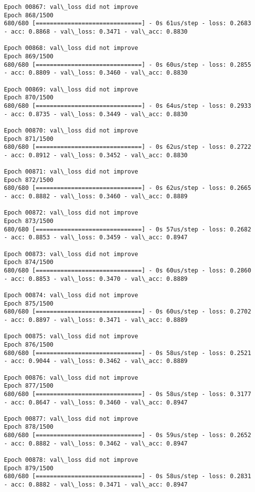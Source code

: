 \documentclass[11pt]{article}
\begin{document}
\begin{Verbatim}[commandchars=\\\{\}]
Epoch 00867: val\_loss did not improve
Epoch 868/1500
680/680 [==============================] - 0s 61us/step - loss: 0.2683 - acc: 0.8868 - val\_loss: 0.3471 - val\_acc: 0.8830

Epoch 00868: val\_loss did not improve
Epoch 869/1500
680/680 [==============================] - 0s 60us/step - loss: 0.2855 - acc: 0.8809 - val\_loss: 0.3460 - val\_acc: 0.8830

Epoch 00869: val\_loss did not improve
Epoch 870/1500
680/680 [==============================] - 0s 64us/step - loss: 0.2933 - acc: 0.8735 - val\_loss: 0.3449 - val\_acc: 0.8830

Epoch 00870: val\_loss did not improve
Epoch 871/1500
680/680 [==============================] - 0s 62us/step - loss: 0.2722 - acc: 0.8912 - val\_loss: 0.3452 - val\_acc: 0.8830

Epoch 00871: val\_loss did not improve
Epoch 872/1500
680/680 [==============================] - 0s 62us/step - loss: 0.2665 - acc: 0.8882 - val\_loss: 0.3460 - val\_acc: 0.8889

Epoch 00872: val\_loss did not improve
Epoch 873/1500
680/680 [==============================] - 0s 57us/step - loss: 0.2682 - acc: 0.8853 - val\_loss: 0.3459 - val\_acc: 0.8947

Epoch 00873: val\_loss did not improve
Epoch 874/1500
680/680 [==============================] - 0s 60us/step - loss: 0.2860 - acc: 0.8853 - val\_loss: 0.3470 - val\_acc: 0.8889

Epoch 00874: val\_loss did not improve
Epoch 875/1500
680/680 [==============================] - 0s 60us/step - loss: 0.2702 - acc: 0.8897 - val\_loss: 0.3471 - val\_acc: 0.8889

Epoch 00875: val\_loss did not improve
Epoch 876/1500
680/680 [==============================] - 0s 58us/step - loss: 0.2521 - acc: 0.9044 - val\_loss: 0.3462 - val\_acc: 0.8889

Epoch 00876: val\_loss did not improve
Epoch 877/1500
680/680 [==============================] - 0s 58us/step - loss: 0.3177 - acc: 0.8647 - val\_loss: 0.3460 - val\_acc: 0.8947

Epoch 00877: val\_loss did not improve
Epoch 878/1500
680/680 [==============================] - 0s 59us/step - loss: 0.2652 - acc: 0.8882 - val\_loss: 0.3462 - val\_acc: 0.8947

Epoch 00878: val\_loss did not improve
Epoch 879/1500
680/680 [==============================] - 0s 58us/step - loss: 0.2831 - acc: 0.8882 - val\_loss: 0.3471 - val\_acc: 0.8947


\end{Verbatim}
\end{document}
